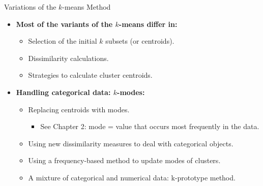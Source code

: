 \begin{frame}{Variations of the $k$-means Method}
	\begin{itemize}
		\item \textbf{Most of the variants of the $k$-means differ in:}
		      \begin{itemize}
			      \item Selection of the initial $k$ subsets (or centroids).
			      \item Dissimilarity calculations.
			      \item Strategies to calculate cluster centroids.
		      \end{itemize}
		\item \textbf{Handling categorical data: $k$-modes:}
		      \begin{itemize}
			      \item Replacing centroids with modes.
			            \begin{itemize}
				            \item See Chapter 2: mode = value that occurs most frequently
				                  in the data.
			            \end{itemize}
			      \item Using new dissimilarity measures to deal with categorical
			            objects.
			      \item Using a frequency-based method to update modes of clusters.
			      \item A mixture of categorical and numerical data: k-prototype
			            method.
		      \end{itemize}
	\end{itemize}
\end{frame}

